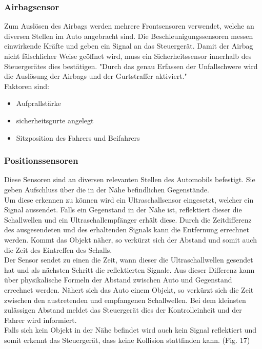 			\subsubsection{Airbagsensor}
					Zum Auslösen des Airbags werden mehrere Frontsensoren verwendet, welche an diversen Stellen im Auto angebracht sind. Die Beschleunigungssensoren messen einwirkende Kräfte und geben ein Signal an das Steuergerät. Damit der Airbag nicht fälschlicher Weise geöffnet wird, muss ein Sicherheitssensor innerhalb des Steuergerätes dies bestätigen. "Durch das genau Erfassen der Unfallschwere wird die Auslösung der Airbags und der Gurtstraffer aktiviert."\cite{TS32}\\
					Faktoren sind: 
					
					\begin{itemize}
						\item Aufprallstärke
						\item sicherheitsgurte angelegt
						\item Sitzposition des Fahrers und Beifahrers
					\end{itemize}
				
				
				\subsubsection{Positionssensoren}
					Diese Sensoren sind an diversen relevanten Stellen des Automobils befestigt. Sie geben Aufschluss über die in der Nähe befindlichen Gegenstände.\\
					Um diese erkennen zu können wird ein Ultraschallsensor eingesetzt, welcher ein Signal aussendet. Falls ein Gegenstand in der Nähe ist, reflektiert dieser die Schallwellen und ein Ultraschallempfänger erhält diese. Durch die Zeitdifferenz des ausgesendeten und des erhaltenden Signals kann die Entfernung errechnet werden. Kommt das Objekt näher, so verkürzt sich der Abstand und somit auch die Zeit des Eintreffen des Schalls.\\
					Der Sensor sendet zu einen die Zeit, wann dieser die Ultraschallwellen gesendet hat und als nächsten Schritt die reflektierten Signale. Aus dieser Differenz kann über physikalische Formeln der Abstand zwischen Auto und Gegenstand errechnet werden. Nähert sich das Auto einem Objekt, so verkürzt sich die Zeit zwischen den austretenden und empfangenen Schallwellen. Bei dem kleinsten zulässigen Abstand meldet das Steuergerät dies der Kontrolleinheit und der Fahrer wird informiert.\\
					Falls sich kein Objekt in der Nähe befindet wird auch kein Signal reflektiert und somit erkennt das Steuergerät, dass keine Kollision stattfinden kann. (Fig. 17)
				
